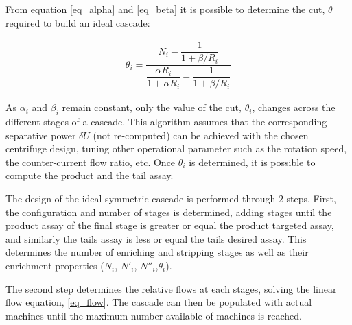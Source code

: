 From equation \eqref{eq_alpha} and \eqref{eq_beta} it is possible to determine
the cut, $\theta$ required to build an ideal cascade:

\begin{eqnarray}
    \theta_{i} = \dfrac{N_{i} - \dfrac{1}{1 + \beta/R_{i}}}{ \dfrac{\alpha R_{i}}{1 + \alpha R_{i}} -
           \dfrac{1}{1 + \beta/R_{i}}}
           \label{eq_theta}
\end{eqnarray}


As $\alpha_{i}$ and $\beta_{i}$ remain constant, only the value of the cut,
$\theta_{i}$, changes across the different stages of a cascade.  This algorithm
assumes that the corresponding separative power $\delta U$ (not re-computed) can
be achieved with the chosen centrifuge design, tuning other operational
parameter such as the rotation speed, the counter-current flow ratio, etc.  Once
$\theta_{i}$ is determined, it is possible to compute the product and the tail
assay.




The design of the ideal symmetric cascade is performed through 2 steps. First,
the configuration and number of stages is determined, adding stages until the
product assay of the final stage is greater or equal the product targeted assay,
and similarly the tails assay is less or equal the tails desired assay.  This
determines the number of enriching and stripping stages as well as their
enrichment properties ($N_{i}$, $N'_{i}$, $N''_{i}$,$\theta_{i}$).


The second step determines the relative flows at each stages, solving the linear
flow equation, \eqref{eq_flow}.
The cascade can then be populated with actual machines until the maximum number
available of machines is reached.


